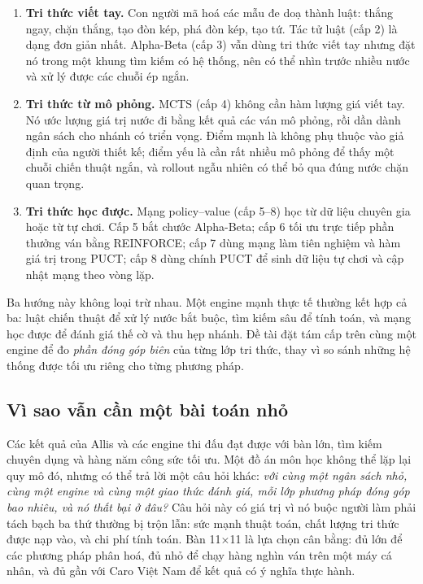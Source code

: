 \begin{enumerate}
  \item \textbf{Tri thức viết tay.} Con người mã hoá các mẫu đe doạ thành luật: thắng ngay,
        chặn thắng, tạo đòn kép, phá đòn kép, tạo tứ. Tác tử luật (cấp 2) là dạng đơn giản nhất.
        Alpha-Beta (cấp 3) vẫn dùng tri thức viết tay nhưng đặt nó trong một khung tìm kiếm có
        hệ thống, nên có thể nhìn trước nhiều nước và xử lý được các chuỗi ép ngắn.
  \item \textbf{Tri thức từ mô phỏng.} MCTS (cấp 4) không cần hàm lượng giá viết tay. Nó ước
        lượng giá trị nước đi bằng kết quả các ván mô phỏng, rồi dần dành ngân sách cho nhánh
        có triển vọng. Điểm mạnh là không phụ thuộc vào giả định của người thiết kế; điểm yếu
        là cần rất nhiều mô phỏng để thấy một chuỗi chiến thuật ngắn, và rollout ngẫu nhiên có
        thể bỏ qua đúng nước chặn quan trọng.
  \item \textbf{Tri thức học được.} Mạng policy--value (cấp 5--8) học từ dữ liệu chuyên gia
        hoặc từ tự chơi. Cấp 5 bắt chước Alpha-Beta; cấp 6 tối ưu trực tiếp phần thưởng ván
        bằng REINFORCE; cấp 7 dùng mạng làm tiên nghiệm và hàm giá trị trong PUCT; cấp 8 dùng
        chính PUCT để sinh dữ liệu tự chơi và cập nhật mạng theo vòng lặp.
\end{enumerate}

Ba hướng này không loại trừ nhau. Một engine mạnh thực tế thường kết hợp cả ba: luật chiến
thuật để xử lý nước bắt buộc, tìm kiếm sâu để tính toán, và mạng học được để đánh giá thế cờ
và thu hẹp nhánh. Đề tài đặt tám cấp trên cùng một engine để đo \emph{phần đóng góp biên} của
từng lớp tri thức, thay vì so sánh những hệ thống được tối ưu riêng cho từng phương pháp.

\subsection{Vì sao vẫn cần một bài toán nhỏ}
Các kết quả của Allis và các engine thi đấu đạt được với bàn lớn, tìm kiếm chuyên dụng và hàng
năm công sức tối ưu. Một đồ án môn học không thể lặp lại quy mô đó, nhưng có thể trả lời một
câu hỏi khác: \emph{với cùng một ngân sách nhỏ, cùng một engine và cùng một giao thức đánh giá,
mỗi lớp phương pháp đóng góp bao nhiêu, và nó thất bại ở đâu?} Câu hỏi này có giá trị vì nó
buộc người làm phải tách bạch ba thứ thường bị trộn lẫn: sức mạnh thuật toán, chất lượng tri
thức được nạp vào, và chi phí tính toán. Bàn 11×11 là lựa chọn cân bằng: đủ lớn để các phương
pháp phân hoá, đủ nhỏ để chạy hàng nghìn ván trên một máy cá nhân, và đủ gần với Caro Việt Nam
để kết quả có ý nghĩa thực hành.

